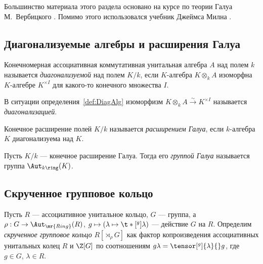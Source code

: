 \documentclass[
	extrafontsizes,
	11pt,
	hyphens,
]{memoir}
\begin{document}
Большинство материала этого раздела основано на курсе по теории Галуа М.\ Вербицкого \cite{verbit_GALOIS_2013}.
Помимо этого использовался учебник Джеймса Милна \cite{milneFT_v5.10}.

\subsection{Диагонализуемые алгебры и расширения Галуа}

\begin{definition} \label{def:DiagAlg}
Конечномерная ассоциативная коммутативная унитальная алгебра \(A\) над полем \(k\) называется \emph{диагонализуемой} над полем \(K/k\),
если \(K\)-алгебра \(K \otimes_k A\) изоморфна \(K\)-алгебре \(K^{\times I}\) для какого-то конечного множества \(I\).
\end{definition}

\begin{remark}
В ситуации определения~\ref{def:DiagAlg} изоморфизм \(K \otimes_k A \xrightarrow{\sim} K^{\times I}\) называется \emph{диагонализацией}.
\end{remark}

\begin{definition}
Конечное расширение полей \(K / k\) называется \emph{расширением Галуа}, если \(k\)-алгебра \(K\) диагонализуема над \(K\).
\end{definition}

\begin{definition}
Пусть \(K/k\) --- конечное расширение Галуа.
Тогда его \emph{группой Галуа} называется группа
\(\Aut_{k\ring}(K)\).
\end{definition}

\subsection{Скрученное групповое кольцо}

\begin{definition} \label{def:TwGrAlg}
Пусть \(R\) --- ассоциативное унитальное кольцо, \(G\) --- группа, а \(\rho : G \to \Aut_{\mr{Ring}}(R)\), \(g \mapsto (\lambda \mapsto \t*[^g]{\lambda}{})\) --- действие \(G\) на \(R\).
Определим \emph{скрученное групповое кольцо} \(R[\rtimes_\rho G]\) как фактор копроизведения ассоциативных унитальных колец \(R\) и \(\Z[G]\) по соотношениям \(g \lambda = \tensor[^g]{\lambda}{} g\), где \(g \in G\), \(\lambda \in R\).
\end{definition}
\end{document}

